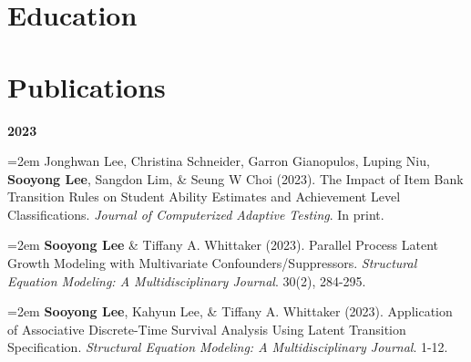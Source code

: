 \documentclass[11pt,letterpaper,]{awesome-me}
\begin{document}
\hypertarget{education}{%
\section{Education}\label{education}}

\begin{cveducations} 

 \end{cveducations}

\vspace{-1em}

\hypertarget{publications}{%
\section{Publications}\label{publications}}

\setlength{\leftskip}{0cm}

\textbf{2023}

\setlength{\leftskip}{0.5cm}

\hangindent=2em  Jonghwan Lee, Christina Schneider, Garron
Gianopulos, Luping Niu, \textbf{Sooyong Lee}, Sangdon Lim, \& Seung W
Choi (2023). The Impact of Item Bank Transition Rules on Student Ability
Estimates and Achievement Level Classifications. \emph{Journal of
Computerized Adaptive Testing}. In print.

\hangindent=2em  \textbf{Sooyong Lee} \& Tiffany A.
Whittaker (2023). Parallel Process Latent Growth Modeling with
Multivariate Confounders/Suppressors. \emph{Structural Equation
Modeling: A Multidisciplinary Journal}. 30(2), 284-295.

\hangindent=2em  \textbf{Sooyong Lee}, Kahyun Lee, \&
Tiffany A. Whittaker (2023). Application of Associative Discrete-Time
Survival Analysis Using Latent Transition Specification.
\emph{Structural Equation Modeling: A Multidisciplinary Journal}. 1-12.
\end{document}
